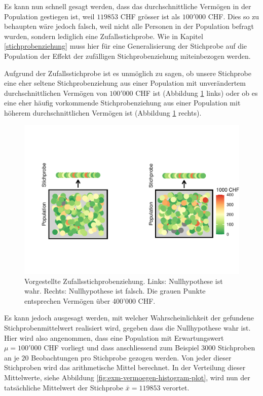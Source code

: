 \documentclass[
]{book}
\theoremstyle{definition}
\theoremstyle{definition}
\theoremstyle{definition}
\theoremstyle{definition}
\theoremstyle{remark}
\begin{document}
Es kann nun schnell gesagt werden, dass das durchschnittliche Vermögen in der Population gestiegen ist, weil \(119853\) CHF grösser ist als \(100'000\) CHF. Dies so zu behaupten wäre jedoch falsch, weil nicht alle Personen in der Population befragt wurden, sondern lediglich eine Zufallsstichprobe. Wie in Kapitel \ref{stichprobenziehung} muss hier für eine Generalisierung der Stichprobe auf die Population der Effekt der zufälligen Stichprobenziehung miteinbezogen werden.

Aufgrund der Zufallsstichprobe ist es unmöglich zu sagen, ob unsere Stichprobe eine eher seltene Stichprobenziehung aus einer Population mit unverändertem durchschnittlichen Vermögen von \(100'000\) CHF ist (Abbildung \ref{fig:exm-vermoegen-sampling-plot} links) oder ob es eine eher häufig vorkommende Stichprobenziehung aus einer Population mit höherem durchschnittlichen Vermögen ist (Abbildung \ref{fig:exm-vermoegen-sampling-plot} rechts).

\begin{figure}
\centering
\includegraphics{aps_statistik1_files/figure-latex/exm-vermoegen-sampling-plot-1.pdf}
\caption{\label{fig:exm-vermoegen-sampling-plot}Vorgestellte Zufallsstichprobenziehung. Links: Nullhypothese ist wahr. Rechts: Nullhypothese ist falsch. Die grauen Punkte entsprechen Vermögen über 400'000 CHF.}
\end{figure}

Es kann jedoch ausgesagt werden, mit welcher Wahrscheinlichkeit der gefundene Stichprobenmittelwert realisiert wird, gegeben dass die Nullhypothese wahr ist. Hier wird also angenommen, dass eine Population mit Erwartungswert \(\mu = 100'000\) CHF vorliegt und dass anschliessend zum Beispiel \(3000\) Stichproben an je \(20\) Beobachtungen pro Stichprobe gezogen werden. Von jeder dieser Stichproben wird das arithmetische Mittel berechnet. In der Verteilung dieser Mittelwerte, siehe Abbildung \ref{fig:exm-vermoegen-histogram-plot}, wird nun der tatsächliche Mittelwert der Stichprobe \(\bar{x} = 119853\) verortet.
\end{document}
